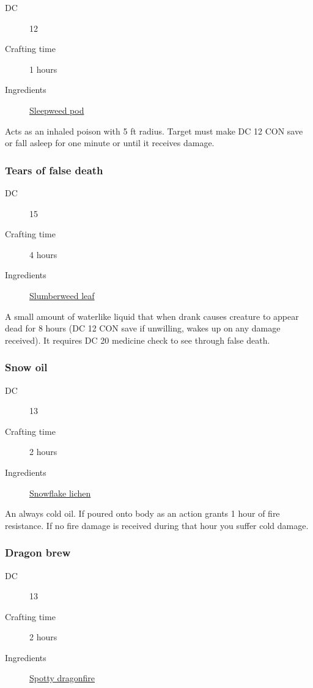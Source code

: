 \begin{description}
\item [DC] 12
\item [Crafting time] 1 hours
\item [Ingredients] \hyperref[Sleepweed]{Sleepweed pod}
\end{description}

Acts as an inhaled poison with 5 ft radius. Target must make DC 12 CON save or 
fall asleep for one minute or until it receives damage.

\subsubsection{Tears of false death}
\label{Tears of false death}

\begin{description}
\item [DC] 15
\item [Crafting time] 4 hours
\item [Ingredients] \hyperref[Slumberweed]{Slumberweed leaf}
\end{description}

A small amount of waterlike liquid that when drank causes creature to appear dead for 
8 hours (DC 12 CON save if unwilling, wakes up on any damage received). 
It requires DC 20 medicine check to see through false death.

\subsubsection{Snow oil}
\label{Snow oil}

\begin{description}
\item [DC] 13
\item [Crafting time] 2 hours
\item [Ingredients] \hyperref[Snowflake Lichen]{Snowflake lichen}
\end{description}

An always cold oil. If poured onto body as an action grants 1 hour of fire resistance. 
If no fire damage is received during that hour you suffer  cold damage.

\subsubsection{Dragon brew}
\label{Dragon brew}

\begin{description}
\item [DC] 13
\item [Crafting time] 2 hours
\item [Ingredients] \hyperref[Spotty Dragonfire]{Spotty dragonfire}
\end{description}

